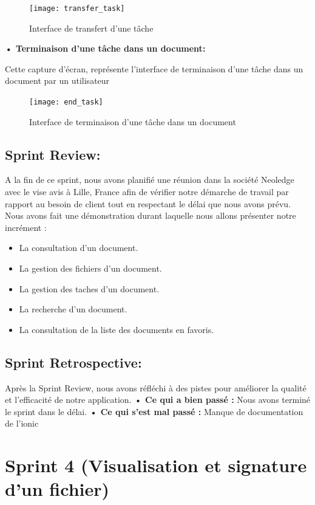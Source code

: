 \begin{figure}[H]
  \centering
  \texttt{[image: transfer\_task]}
  \caption{Interface de transfert d'une tâche}
  \label{fig:transfer_task}
\end{figure}

\textbf{•	Terminaison d'une tâche dans un document:}

Cette capture d'écran, représente l'interface de terminaison d'une tâche dans un document par un utilisateur

\begin{figure}[H]
  \centering
  \texttt{[image: end\_task]}
  \caption{Interface de terminaison d'une tâche dans un document}
  \label{fig:end_task}
\end{figure}




\subsection{Sprint Review:}
A la fin de ce sprint, nous avons planifié une réunion dans la société Neoledge avec le vise avis à Lille, France afin de vérifier notre démarche de travail par rapport au besoin de client tout en respectant le délai que nous avons prévu.
Nous avons fait une démonstration durant laquelle nous allons présenter notre incrément :
\begin{itemize}
  \item La consultation d'un document.
  \item La gestion des fichiers d'un document.
  \item La gestion des taches d'un document.
  \item La recherche d'un document.
  \item La consultation de la liste des documents en favoris.
\end{itemize}

\subsection{Sprint Retrospective:}

Après la Sprint Review, nous avons réfléchi à des pistes pour améliorer la qualité et l'efficacité de notre application.
\noindent\textbf{•	Ce qui a bien passé :}
Nous avons terminé le sprint dans le délai.
\noindent\textbf{•	Ce qui s'est mal passé :}
Manque de documentation de l'ionic 


\section{Sprint 4 (Visualisation et signature d'un fichier)}
